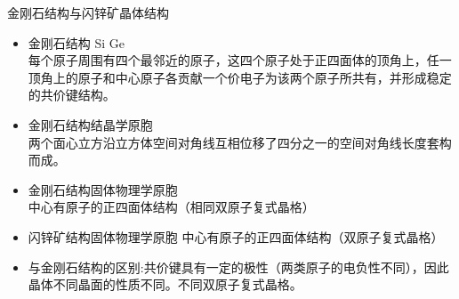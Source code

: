 \documentclass[trans]{beamer} %
\begin{document}
\begin{frame}{金刚石结构与闪锌矿晶体结构}

    \begin{itemize}
        \item \alert{金刚石结构 Si Ge}\\每个原子周围有四个最邻近的原子，这四个原子处于正四面体的顶角上，任一顶角上的原子和中心原子各贡献一个价电子为该两个原子所共有，并形成稳定的共价键结构。
        \item \alert{金刚石结构结晶学原胞}\\
两个面心立方沿立方体空间对角线互相位移了四分之一的空间对角线长度套构而成。
        \item \alert{金刚石结构固体物理学原胞}\\
中心有原子的正四面体结构（相同双原子复式晶格）
        \item 闪锌矿结构固体物理学原胞
中心有原子的正四面体结构（双原子复式晶格）
        \item 与金刚石结构的区别:共价键具有一定的极性（两类原子的电负性不同），因此晶体不同晶面的性质不同。不同双原子复式晶格。
   \end{itemize}
\end{frame}
\end{document}
